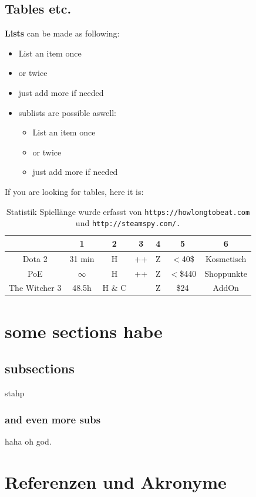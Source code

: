 \documentclass[10pt]{article}
\begin{document}
\subsection{Tables etc.}

\textbf{Lists} can be made as following:
\begin{itemize}
\item List an item once
\item or twice
\item just add more if needed
\item sublists are possible aswell:
\begin{itemize}
\item List an item once
\item or twice
\item just add more if needed
\end{itemize}
\end{itemize}

If you are looking for tables, here it is:
\begin{table}[H]
\centering
\begin{tabular}{ |c|c|c|c|c|c|c| }
\hline
 & 1 & 2 & 3 & 4 & 5 & 6 \\
\hline
Dota 2 & 31 min & H & ++ & Z & $<$40\$ & Kosmetisch \\
\hline
PoE & $\infty$ & H & ++ & Z & $<$\$440 & Shoppunkte \\
\hline
The Witcher 3 & 48.5h & H \& C &  & Z & \$24 & AddOn \\
\hline
\end{tabular}
\caption{Statistik Spiellänge wurde erfasst von \texttt{https://howlongtobeat.com} und \texttt{http://steamspy.com/.}}
\label{table:1}
\end{table}

\section{some sections habe}
\subsection{subsections}
stahp
\subsubsection{and even more subs}
haha oh god.

\section{Referenzen und Akronyme}

\printglossaries


%
%

%


\listoffigures
\listoftables

\end{document}
